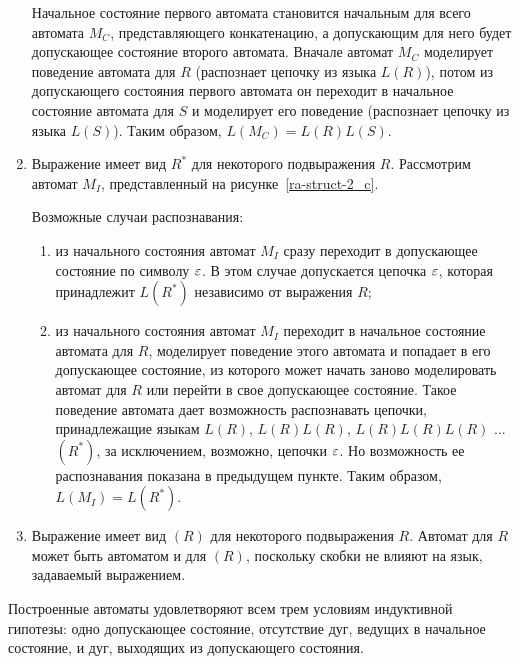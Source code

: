 \begin{myproof}
\begin{enumerate}

	
Начальное состояние первого автомата становится начальным для всего автомата $M_C$, представляющего конкатенацию, а допускающим для него будет допускающее состояние второго автомата. Вначале автомат $M_C$ моделирует поведение автомата для $R$ (распознает цепочку из языка $L(R)$), потом из допускающего состояния первого автомата он переходит в начальное состояние автомата для $S$ и моделирует его поведение (распознает цепочку из языка $L(S)$). Таким образом, $L(M_C) = L(R)L(S)$.
	\item Выражение имеет вид $R^*$ для некоторого подвыражения $R$. Рассмотрим автомат $M_I$, представленный на рисунке~\ref{ra-struct-2_c}. 
	
Возможные случаи распознавания:
	\begin{enumerate}
		\item из начального состояния автомат  $M_I$ сразу переходит в допускающее состояние по символу $\varepsilon$. В этом случае допускается цепочка $\varepsilon$, которая принадлежит $L(R^*)$ независимо от выражения $R$;
		\item из начального состояния автомат  $M_I$ переходит в начальное состояние автомата для $R$, моделирует поведение этого автомата и попадает в его допускающее состояние, из которого может начать заново моделировать автомат для $R$ или перейти в свое допускающее состояние. Такое поведение автомата дает возможность распознавать цепочки, принадлежащие языкам $L(R)$, $L(R)L(R)$, $L(R)L(R)L(R)$ ... $(R^*)$, за исключением, возможно, цепочки $\varepsilon$. Но возможность ее распознавания показана в предыдущем пункте. Таким образом, $L(M_I) = L(R^*)$.
	\end{enumerate}
	\item Выражение имеет вид $(R)$ для некоторого подвыражения $R$. Автомат для $R$ может быть автоматом и для $(R)$, поскольку скобки не влияют на язык, задаваемый выражением.
\end{enumerate}
Построенные автоматы удовлетворяют всем трем условиям индуктивной гипотезы: одно допускающее состояние, отсутствие дуг, ведущих в начальное состояние, и дуг, выходящих из допускающего состояния.
\end{myproof}
